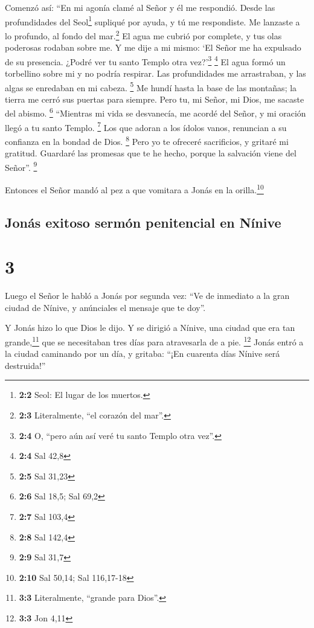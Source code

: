  Comenzó así: ``En mi agonía clamé al Señor y él me
respondió. Desde las profundidades del Seol\footnote{\textbf{2:2} Seol:
  El lugar de los muertos.} supliqué por ayuda, y tú me respondiste.
 Me lanzaste a lo profundo, al fondo del mar.\footnote{\textbf{2:3}
  Literalmente, ``el corazón del mar''.} El agua me cubrió por complete,
y tus olas poderosas rodaban sobre me.  Y me dije a mi
mismo: `El Señor me ha expulsado de su presencia. ¿Podré ver tu santo
Templo otra vez?'\footnote{\textbf{2:4} O, ``pero aún así veré tu santo
  Templo otra vez''.} \footnote{\textbf{2:4} Sal 42,8}  El
agua formó un torbellino sobre mi y no podría respirar. Las
profundidades me arrastraban, y las algas se enredaban en mi cabeza.
\footnote{\textbf{2:5} Sal 31,23}  Me hundí hasta la base
de las montañas; la tierra me cerró sus puertas para siempre. Pero tu,
mi Señor, mi Dios, me sacaste del abismo. \footnote{\textbf{2:6} Sal
  18,5; Sal 69,2}  ``Mientras mi vida se desvanecía, me
acordé del Señor, y mi oración llegó a tu santo Templo. \footnote{\textbf{2:7}
  Sal 103,4}  Los que adoran a los ídolos vanos, renuncian
a su confianza en la bondad de Dios. \footnote{\textbf{2:8} Sal 142,4}
 Pero yo te ofreceré sacrificios, y gritaré mi gratitud.
Guardaré las promesas que te he hecho, porque la salvación viene del
Señor''. \footnote{\textbf{2:9} Sal 31,7}

 Entonces el Señor mandó al pez a que vomitara a Jonás en
la orilla.\footnote{\textbf{2:10} Sal 50,14; Sal 116,17-18}

\hypertarget{jonuxe1s-exitoso-sermuxf3n-penitencial-en-nuxednive}{%
\subsection{Jonás exitoso sermón penitencial en
Nínive}\label{jonuxe1s-exitoso-sermuxf3n-penitencial-en-nuxednive}}

\hypertarget{section-2}{%
\section{3}\label{section-2}}

 Luego el Señor le habló a Jonás por segunda vez:
 ``Ve de inmediato a la gran ciudad de Nínive, y
anúnciales el mensaje que te doy''.

 Y Jonás hizo lo que Dios le dijo. Y se dirigió a Nínive,
una ciudad que era tan grande,\footnote{\textbf{3:3} Literalmente,
  ``grande para Dios''.} que se necesitaban tres días para atravesarla
de a pie. \footnote{\textbf{3:3} Jon 4,11}  Jonás entró a
la ciudad caminando por un día, y gritaba: ``¡En cuarenta días Nínive
será destruida!''


